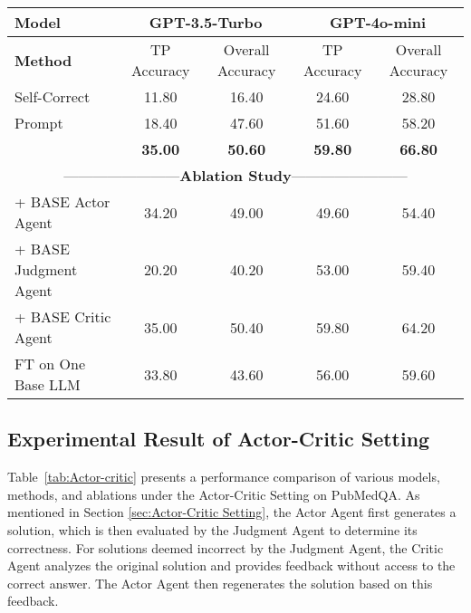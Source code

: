 \begin{table*}[t]
\caption{Evaluation results of the proposed method and baselines on accuracy(\%).}
\centering
\small
\label{tab:Actor-critic}
\begin{tabular}{l|cc|cc}
\toprule
\textbf{Model }         &\multicolumn{2}{c|}{GPT-3.5-Turbo}  &\multicolumn{2}{c}{GPT-4o-mini}   \\
\midrule
\textbf{Method  }       & TP Accuracy& Overall Accuracy& TP Accuracy& Overall Accuracy  \\
\midrule
Self-Correct   & 11.80          &     16.40       & 24.60         & 28.80          \\
Prompt         & 18.40          &     47.60       & 51.60         & 58.20      \\
\model{}       & \textbf{35.00} &\textbf{ 50.60}  &\textbf{59.80 }&\textbf{66.80 }     \\
\midrule
\multicolumn{5}{c}{------------------------\qquad \textbf{Ablation Study}\qquad------------------------} \\
\model{} + BASE Actor Agent&   34.20  &  49.00   & 49.60         & 54.40  \\
\model{} + BASE Judgment Agent&  20.20 &  40.20    & 53.00         &  59.40   \\
\model{} + BASE Critic Agent&   35.00   &   50.40  &   59.80       &  64.20  \\
FT on One Base LLM        &    33.80 &    43.60  &    56.00      & 59.60    \\

\bottomrule
\end{tabular}
\end{table*}

\subsection{Experimental Result of Actor-Critic Setting}

Table~\ref{tab:Actor-critic} presents a performance comparison of various models, methods, and ablations under the Actor-Critic Setting on PubMedQA. 
As mentioned in Section \ref{sec:Actor-Critic Setting}, the Actor Agent first generates a solution, which is then evaluated by the Judgment Agent to determine its correctness. For solutions deemed incorrect by the Judgment Agent, the Critic Agent analyzes the original solution and provides feedback without access to the correct answer. The Actor Agent then regenerates the solution based on this feedback.

